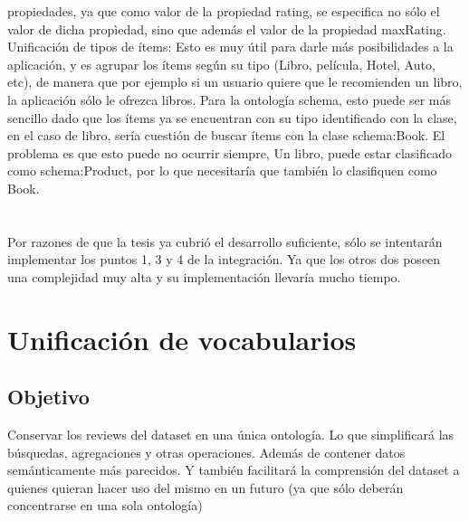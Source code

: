 propiedades, ya que como valor de la propiedad rating, se especifica no sólo el valor de dicha propìedad, sino que además el valor de la 
propiedad maxRating. \\
Unificación de tipos de ítems: Esto es muy útil para darle más posibilidades a la aplicación, y es agrupar los ítems según su tipo 
(Libro, película, Hotel, Auto, etc), de manera que por ejemplo si un usuario quiere que le recomienden un libro, la aplicación sólo 
le ofrezca libros. Para la ontología schema, esto puede ser más sencillo dado que los ítems ya se encuentran con su tipo identificado con 
la clase, en el caso de libro, sería cuestión de buscar ítems con la clase schema:Book. El problema es que esto puede no ocurrir siempre, 
Un libro, puede estar clasificado como schema:Product, por lo que necesitaría que también lo clasifiquen como Book.\\
\\
\\
Por razones de que la tesis ya cubrió el desarrollo suficiente, sólo se intentarán implementar los puntos 1, 3 y 4 de la integración. Ya que 
los otros dos poseen una complejidad muy alta y su implementación llevaría mucho tiempo.\\

\section{Unificación de vocabularios}
\label{section:unificacion-vocabularios}

\subsection*{Objetivo} Conservar los reviews del dataset en una única ontología. Lo que simplificará las búsquedas, agregaciones y otras operaciones.
Además de contener datos semánticamente más parecidos. Y también facilitará la comprensión del dataset a quienes quieran hacer uso del mismo
en un futuro (ya que sólo deberán concentrarse en una sola ontología)

